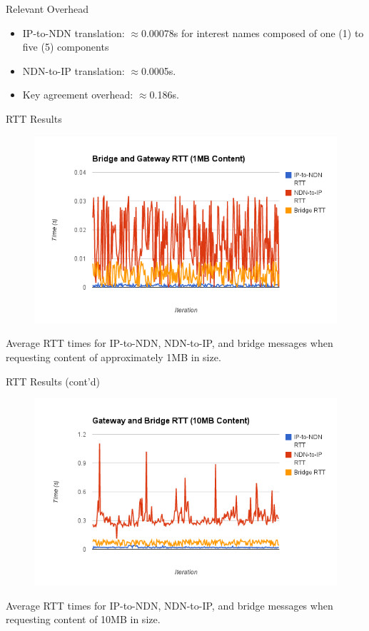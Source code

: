 \documentclass[handout]{beamer}
\begin{document}
\begin{frame}{Relevant Overhead}
	\begin{itemize}
		\item IP-to-NDN translation: $\approx$0.00078s for interest names composed of one (1) to five (5) components
		\item NDN-to-IP translation: $\approx$0.0005s.
		\item Key agreement overhead: $\approx$0.186s.
	\end{itemize}
\end{frame}

\begin{frame}{RTT Results}
	\begin{figure}
	\begin{center}
	\includegraphics[scale=0.4]{./img/small.png}
	\label{fig:perf1}
	\end{center}
	\end{figure}
	Average RTT times for IP-to-NDN, NDN-to-IP, and bridge messages when requesting content of approximately 1MB in size.
\end{frame}

\begin{frame}{RTT Results (cont'd)}
	\begin{figure}
	\begin{center}
	\includegraphics[scale=0.4]{./img/large.png}
	\label{fig:perf2}
	\end{center}
	\end{figure}
	Average RTT times for IP-to-NDN, NDN-to-IP, and bridge messages when requesting content of 10MB in size.
\end{frame}
\end{document}
